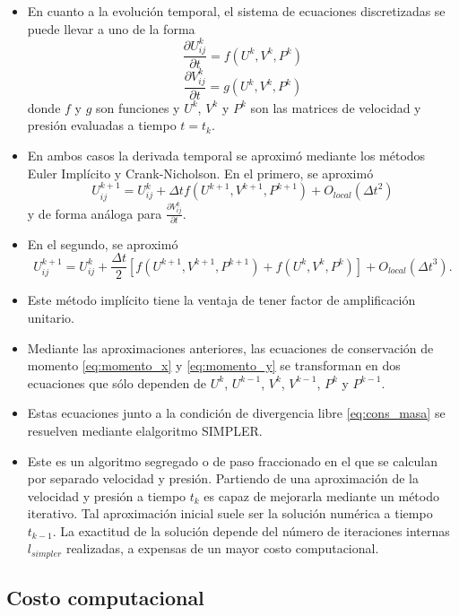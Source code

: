 \documentclass[aps,prb,twocolumn,superscriptaddress,floatfix,longbibliography,10pt]{revtex4-2}
\newif\ifptitle
\newif\ifpnumber
\newcounter{para}
\newcommand\ptitle[1]{\par\refstepcounter{para}
{\ifpnumber{\noindent\textcolor{lightgray}{\textbf{\thepara}}\indent}\fi}
{\ifptitle{\textbf{[{#1}]}}\fi}}
\begin{document}
\ptitle{Método de evolución temporal}
\begin{itemize}
  \item En cuanto a la evolución temporal, el sistema de ecuaciones discretizadas se puede llevar a uno de la forma
  \[\frac{\partial U_{ij}^k}{\partial t} = f(U^k,V^k,P^k)\]
  \[\frac{\partial V_{ij}^k}{\partial t} = g(U^k,V^k,P^k)\]
  donde $f$ y $g$ son funciones y $U^k$, $V^k$ y $P^k$ son las matrices de velocidad y presión evaluadas a tiempo $t = t_k$.
  \item En ambos casos la derivada temporal se aproximó mediante los métodos Euler Implícito y Crank-Nicholson. En el primero, se aproximó
  \[U_{ij}^{k+1} = U_{ij}^{k} + \Delta t f(U^{k+1},V^{k+1},P^{k+1})  + O_{local}({\Delta t}^2)\]
  y de forma análoga para $\frac{\partial V_{ij}^k}{\partial t}$.

  \item En el segundo, se aproximó
  \[U_{ij}^{k+1} = U_{ij}^{k} + \frac{\Delta t}{2} [f(U^{k+1},V^{k+1},P^{k+1}) + f(U^{k},V^{k},P^{k})] + O_{local}({\Delta t}^3).\]
  \item Este método implícito tiene la ventaja de tener factor de amplificación unitario.

\end{itemize}

\ptitle{Algoritmo simpler simplificadamente}
\begin{itemize}
  \item Mediante las aproximaciones anteriores, las ecuaciones de conservación de momento \ref{eq:momento_x} y \ref{eq:momento_y} se transforman en dos ecuaciones que sólo dependen de $U^k$, $U^{k-1}$, $V^k$, $V^{k-1}$, $P^k$ y $P^{k-1}$.
  \item Estas ecuaciones junto a la condición de divergencia libre \ref{eq:cons_masa} se resuelven mediante elalgoritmo SIMPLER. \cite{Patankar}
  \item Este es un algoritmo segregado o de paso fraccionado en el que se calculan por separado velocidad y presión. Partiendo de una aproximación de la velocidad y presión a tiempo $t_k$ es capaz de mejorarla mediante un método iterativo. Tal aproximación inicial suele ser la solución numérica a tiempo $t_{k-1}$. La exactitud de la solución depende del número de iteraciones internas $l_{simpler}$ realizadas, a expensas de un mayor costo computacional.
\end{itemize}



\subsection{Costo computacional}
\end{document}
